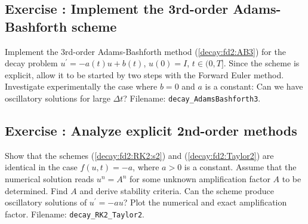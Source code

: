 \documentclass[graybox,sectrefs,envcountresetchap,open=right,final]{svmonodo}
\newenvironment{doconceexercise}{}{}
\newcounter{doconceexercisecounter}
\begin{document}
\begin{doconceexercise}

\subsection*{Exercise \thedoconceexercisecounter: Implement the 3rd-order Adams-Bashforth scheme}

\label{decay:fd2:exer:AB3}

Implement the 3rd-order Adams-Bashforth method (\ref{decay:fd2:AB3})
for the decay problem $u^{\prime}=-a(t)u + b(t)$, $u(0)=I$, $t\in (0, T]$.
Since the scheme is explicit, allow it to be started by two steps with
the Forward Euler method.  Investigate experimentally the case where
$b=0$ and $a$ is a constant: Can we have oscillatory solutions for
large $\Delta t$?
\noindent Filename: \Verb!decay_AdamsBashforth3!.

\end{doconceexercise}




\begin{doconceexercise}

\subsection*{Exercise \thedoconceexercisecounter: Analyze explicit 2nd-order methods}

\label{decay:exer:RK2:Taylor:analysis}

Show that the schemes (\ref{decay:fd2:RK2:s2}) and
(\ref{decay:fd2:Taylor2}) are identical in the case $f(u,t)=-a$, where
$a>0$ is a constant. Assume that the numerical solution reads
$u^n=A^n$ for some unknown amplification factor $A$ to be determined.
Find $A$ and derive stability criteria. Can the scheme produce
oscillatory solutions of $u^{\prime}=-au$? Plot the numerical and exact
amplification factor.
\noindent Filename: \Verb!decay_RK2_Taylor2!.

\end{doconceexercise}
\end{document}
